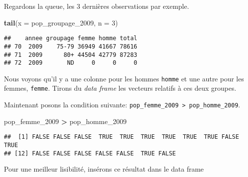 \documentclass[]{book}
\newenvironment{Shaded}{\begin{snugshade}}{\end{snugshade}}
\newcommand{\KeywordTok}[1]{\textcolor[rgb]{0.13,0.29,0.53}{\textbf{#1}}}
\newcommand{\DataTypeTok}[1]{\textcolor[rgb]{0.13,0.29,0.53}{#1}}
\newcommand{\DecValTok}[1]{\textcolor[rgb]{0.00,0.00,0.81}{#1}}
\newcommand{\StringTok}[1]{\textcolor[rgb]{0.31,0.60,0.02}{#1}}
\newcommand{\OperatorTok}[1]{\textcolor[rgb]{0.81,0.36,0.00}{\textbf{#1}}}
\newcommand{\NormalTok}[1]{#1}
\begin{document}
Regardons la queue, les 3 dernières observations par exemple.

\begin{Shaded}
\begin{Highlighting}[]
\KeywordTok{tail}\NormalTok{(}\DataTypeTok{x =}\NormalTok{ pop_groupage_}\DecValTok{2009}\NormalTok{, }\DataTypeTok{n =} \DecValTok{3}\NormalTok{)}
\end{Highlighting}
\end{Shaded}

\begin{verbatim}
##    annee groupage femme homme total
## 70  2009    75-79 36949 41667 78616
## 71  2009      80+ 44504 42779 87283
## 72  2009       ND     0     0     0
\end{verbatim}

Nous voyons qu'il y a une colonne pour les hommes \texttt{homme} et une
autre pour les femmes, \texttt{femme}. Tirons du \emph{data frame} les
vecteurs relatifs à ces deux groupes.

\begin{Shaded}
\end{Shaded}

Maintenant posons la condition suivante:
\texttt{pop\_femme\_2009\ \textgreater{}\ pop\_homme\_2009}.

\begin{Shaded}
\begin{Highlighting}[]
\NormalTok{pop_femme_}\DecValTok{2009} \OperatorTok{>}\StringTok{ }\NormalTok{pop_homme_}\DecValTok{2009}
\end{Highlighting}
\end{Shaded}

\begin{verbatim}
##  [1] FALSE FALSE FALSE  TRUE  TRUE  TRUE  TRUE  TRUE  TRUE FALSE  TRUE
## [12] FALSE FALSE FALSE FALSE FALSE  TRUE FALSE
\end{verbatim}

Pour une meilleur lisibilité, insérons ce résultat dans le data frame

\begin{Shaded}
\end{Shaded}
\end{document}
